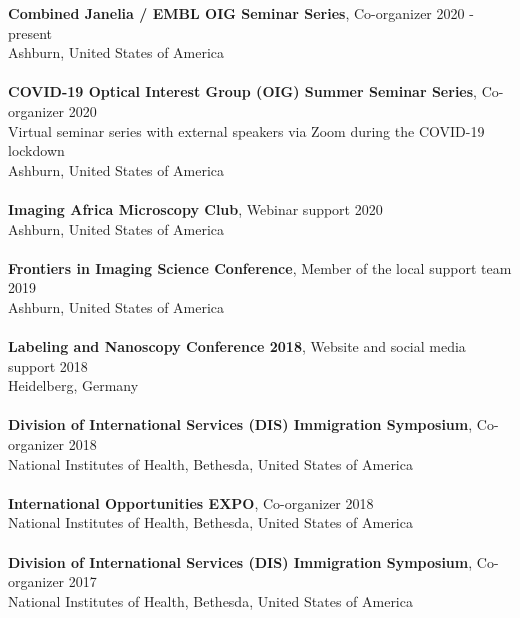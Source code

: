 \documentclass[margin,line]{res}
\begin{document}
\begin{resume}
{\bf Combined Janelia / EMBL OIG Seminar Series}, Co-organizer \hfill {2020 - present}\\
Ashburn, United States of America\\
\vspace*{-3mm}\\
{\bf COVID-19 Optical Interest Group (OIG) Summer Seminar Series}, Co-organizer \hfill {2020}\\
Virtual seminar series with external speakers via Zoom during the COVID-19 lockdown\\
Ashburn, United States of America\\
\vspace*{-3mm}\\
{\bf Imaging Africa Microscopy Club}, Webinar support \hfill {2020}\\
Ashburn, United States of America\\
\vspace*{-3mm}\\
{\bf Frontiers in Imaging Science Conference}, Member of the local support team \hfill {2019}\\
Ashburn, United States of America\\
\vspace*{-3mm}\\
{\bf Labeling and Nanoscopy Conference 2018}, Website and social media support \hfill {2018}\\
Heidelberg, Germany\\
\vspace*{-3mm}\\
{\bf Division of International Services (DIS) Immigration Symposium}, Co-organizer  \hfill {2018}\\
National Institutes of Health, Bethesda, United States of America\\
\vspace*{-3mm}\\
{\bf International Opportunities EXPO}, Co-organizer \hfill {2018}\\
National Institutes of Health, Bethesda, United States of America\\
\vspace*{-3mm}\\
{\bf Division of International Services (DIS) Immigration Symposium}, Co-organizer  \hfill {2017}\\
National Institutes of Health, Bethesda, United States of America\\
\vspace*{-3mm}\\

\end{resume}
\end{document}
